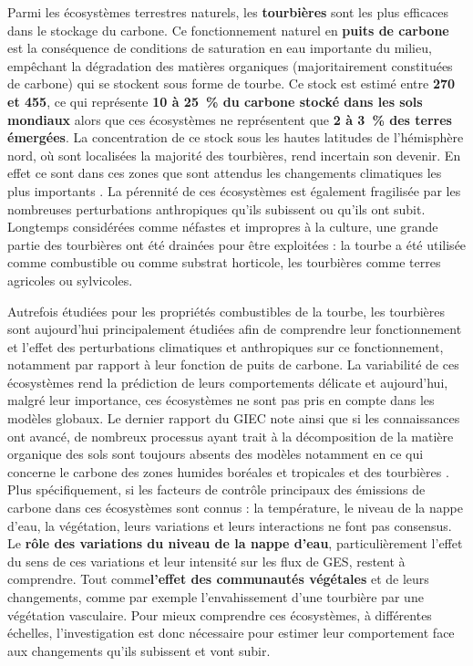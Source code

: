 Parmi les écosystèmes terrestres naturels, les \textbf{tourbières} sont les plus efficaces dans le stockage du carbone.
Ce fonctionnement naturel en \textbf{puits de carbone} est la conséquence de conditions de saturation en eau importante du milieu, empêchant la dégradation des matières organiques (majoritairement constituées de carbone)  qui se stockent sous forme de tourbe.
Ce stock est estimé entre \textbf{270 et  \SI{455}{\pgc}}, ce qui représente \textbf{10 à \SI{25}{\percent} du carbone stocké dans les sols mondiaux} alors que ces écosystèmes ne représentent que \textbf{2 à \SI{3}{\percent} des terres émergées}.
La concentration de ce stock sous les hautes latitudes de l'hémisphère nord, où sont localisées la majorité des tourbières, rend incertain son devenir. 
En effet ce sont dans ces zones que sont attendus les changements climatiques les plus importants \citep{Ciais2014}.
La pérennité de ces écosystèmes est également fragilisée par les nombreuses perturbations anthropiques qu'ils subissent ou qu'ils ont subit.
Longtemps considérées comme néfastes et impropres à la culture, une grande partie des tourbières ont été drainées pour être exploitées : la tourbe a été utilisée comme combustible ou comme substrat horticole, les tourbières comme terres agricoles ou sylvicoles.

Autrefois étudiées pour les propriétés combustibles de la tourbe, les tourbières sont aujourd'hui principalement étudiées afin de comprendre leur fonctionnement et l'effet des perturbations climatiques et anthropiques sur ce fonctionnement, notamment par rapport à leur fonction de puits de carbone.
La variabilité de ces écosystèmes rend la prédiction de leurs comportements délicate et aujourd'hui, malgré leur importance, ces écosystèmes ne sont pas pris en compte dans les modèles globaux.
Le dernier rapport du GIEC note ainsi que si les connaissances ont avancé, de nombreux processus ayant trait à la décomposition de la matière organique des sols sont toujours absents des modèles notamment en ce qui concerne le carbone des zones humides boréales et tropicales et des tourbières \citep{Ciais2014}.
Plus spécifiquement, si les facteurs de contrôle principaux des émissions de carbone dans ces écosystèmes sont connus : la température, le niveau de la nappe d'eau, la végétation, leurs variations et leurs interactions ne font pas consensus. 
Le \textbf{rôle des variations du niveau de la nappe d'eau}, particulièrement l'effet du sens de ces variations et leur intensité sur les flux de GES, restent à comprendre.
Tout comme\textbf{l'effet des communautés végétales} et de leurs changements, comme par exemple l'envahissement d'une tourbière par une végétation vasculaire.
Pour mieux comprendre ces écosystèmes, à différentes échelles, l'investigation est donc nécessaire pour estimer leur comportement face aux changements qu'ils subissent et vont subir.

